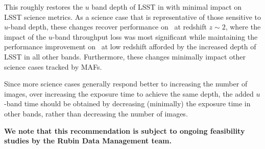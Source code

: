 This roughly restores the $u$ band depth of LSST in  with minimal impact on LSST science metrics. As a science case that is representative of those sensitive to $u$-band depth, these changes recover performance on \pz\ at redshift $z\sim2$, where the impact of the $u$-band throughput loss was most significant while maintaining the performance improvement on \pz\ at low redshift afforded by the increased depth of LSST in all other bands. Furthermore, these changes minimally impact other science cases tracked by MAFs. 

Since more science cases generally respond better to increasing the number of images, over increasing the exposure time to achieve the same depth, the added $u$-band time should be obtained by decreasing (minimally) the exposure time in other bands, rather than decreasing the number of images.

\textbf{ We note that this recommendation is subject to ongoing feasibility studies by the Rubin Data 
Management team.}

